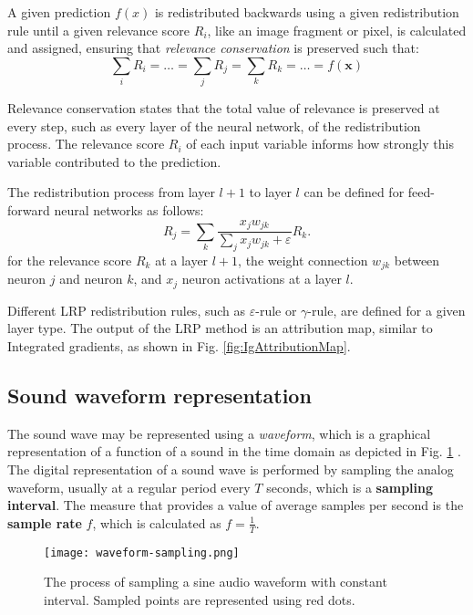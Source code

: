 \documentclass[
    bindingoffset=5mm,  %
    footnoteindent=3mm, %
    hyphenation=true    %
]{src/wut-thesis}
\begin{document}
A given prediction $f(x)$ is redistributed backwards using a given
redistribution rule until a given relevance score $R_i$, like an image fragment or pixel,
is calculated and assigned, ensuring that \emph{relevance conservation} is preserved such that:
\[
\sum_{i} R_{i} = \ldots = \sum_{j} R_{j} = \sum_{k} R_{k} = \ldots = f(\mathbf{x}) \tag{1}
\]

Relevance conservation states that the total value of relevance is preserved
at every step, such as every layer of the neural network, of the redistribution process.
The relevance score $R_i$ of each input variable informs how strongly this variable contributed
to the prediction. 

The redistribution process from layer  $l + 1$ to layer $l$ can be
defined for feed-forward neural networks as follows:
\[
R_j = \sum_k \frac{x_j w_{jk}}{\sum_{j} x_{j} w_{jk} + \varepsilon} R_k.
\]
for the relevance score $R_k$ at a layer $l + 1$, the weight connection $w_{jk}$ between
neuron $j$ and neuron $k$, and $x_j$ neuron activations at a layer $l$.

Different LRP redistribution rules, such as \( \varepsilon \)-rule or \( \gamma \)-rule,
are defined for a given layer type.
The output of the LRP method is an attribution map, similar to Integrated gradients,
as shown in Fig. \ref{fig:IgAttributionMap}.

\subsection{Sound waveform representation}
The sound wave may be represented using a \emph{waveform}, which is a graphical
representation of a function of a sound in the time domain as depicted in
Fig. \ref{fig:waveform-sampling} \cite{Anand2024}.
The digital representation of a sound wave is performed by sampling the analog waveform,
usually at a regular period every $T$ seconds, which is a \textbf{sampling interval}. The measure that provides
a value of average samples per second is the \textbf{sample rate} $f$, which is calculated as $f = \frac{1}{T}$.

\begin{figure}[h!] %
    \centering
    \texttt{[image: waveform-sampling.png]}
    \caption{The process of sampling a sine audio waveform with constant interval.
        Sampled points are represented using red dots.}
    \label{fig:waveform-sampling}
\end{figure}
\end{document}
